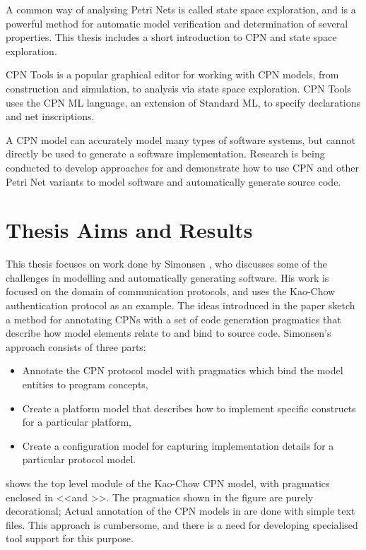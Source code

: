 A common way of analysing
Petri Nets is called state space exploration, and is a powerful method for
automatic model verification and determination of several properties. This
thesis includes a short introduction to CPN and state space exploration.


CPN Tools \cite{cpntools} is a popular graphical
editor for working with CPN models, from construction and simulation, to
analysis via state space exploration. CPN Tools uses the CPN ML language, an
extension of Standard ML, to specify declarations and net inscriptions.

	
A CPN model can accurately model many types of software systems, but cannot
directly be used to generate a software implementation. Research is being
conducted to develop approaches for and demonstrate how to use CPN and other
Petri Net variants to model software and automatically generate source code.


\section{Thesis Aims and Results}
This thesis focuses on work done by Simonsen \cite{Simonsen2011}, who discusses
some of the challenges in modelling and automatically generating software. His
work is focused on the domain of communication protocols, and uses the Kao-Chow
authentication protocol as an example.
The ideas introduced in the paper sketch a method for annotating CPNs with a
set of code generation pragmatics that describe how model elements relate to and
bind to source code. Simonsen's approach consists of three parts: 
\begin{itemize}
	\item Annotate the CPN protocol model with pragmatics which bind the model
	entities to program concepts,
	\item Create a platform	model that describes how to implement specific
	constructs for a particular platform,
	\item Create a configuration model for capturing implementation details for a
	particular protocol model.
\end{itemize}  

 shows the top level module of the Kao-Chow CPN model, with
pragmatics enclosed in \textless\textless and \textgreater\textgreater.
The pragmatics shown in the figure are purely decorational; Actual annotation of
the CPN models in \cite{Simonsen2011} are done with simple text files. This
approach is cumbersome, and there is a need for developing specialised tool
support for this purpose.


